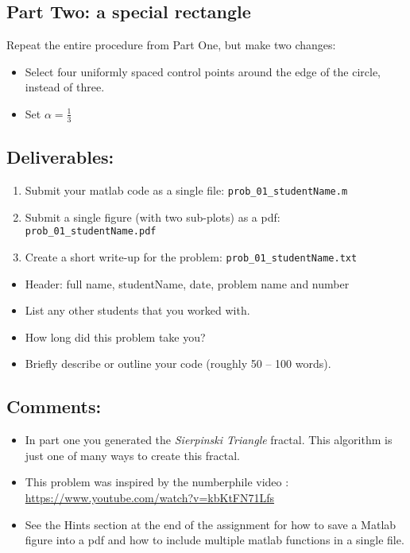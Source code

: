 \subsection*{Part Two:  a special rectangle}

Repeat the entire procedure from Part One, but make two changes:
\vspace{-0.6em} \begin{itemize}  \setlength\itemsep{0em}
  \item Select four uniformly spaced control points around the edge of the circle, instead of three.
  \item Set $\alpha = \tfrac{1}{3}$
\end{itemize}

\subsection*{Deliverables:}

\begin{enumerate}
  \item Submit your matlab code as a single file:  \texttt{prob\_01\_studentName.m}
  \item Submit a single figure (with two sub-plots) as a pdf:  \texttt{prob\_01\_studentName.pdf}
  \item Create a short write-up for the problem:   \texttt{prob\_01\_studentName.txt}
\end{enumerate}

\vspace{-1.0em} \begin{itemize}  \setlength\itemsep{0em} \setlength\itemindent{18pt}
  \item Header: full name, studentName, date, problem name and number
  \item List any other students that you worked with.
  \item How long did this problem take you?
  \item Briefly describe or outline your code (roughly 50 -- 100 words).
\end{itemize}

\subsection*{Comments:}
  \vspace{-0.3em} \begin{itemize}  \setlength\itemsep{0em}
    \item In part one you generated the \textit{Sierpinski Triangle} fractal.
          This algorithm is just one of many ways to create this fractal.
    \item This problem was inspired by the numberphile video : \\
          \url{https://www.youtube.com/watch?v=kbKtFN71Lfs}
    \item See the Hints section at the end of the assignment for
          how to save a Matlab figure into a pdf and
          how to include multiple matlab functions in a single file.
\end{itemize}

